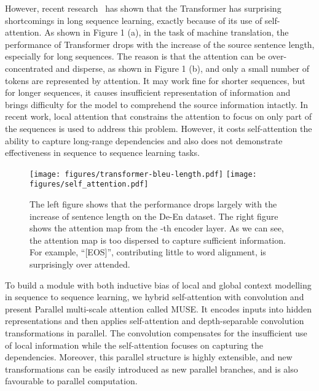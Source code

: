 \documentclass{article} \usepackage{iclr2020_conference,times}
\begin{document}
However, recent research~\citep{DBLP:conf/emnlp/TangMRS18} has shown that the Transformer has surprising shortcomings in long sequence learning, exactly because of its use of self-attention. As shown in Figure 1 (a), in the task of machine translation, the performance of Transformer drops with the increase of the source sentence length, especially for long sequences. The reason is that the attention can be over-concentrated and disperse, as shown in Figure 1 (b), and only a small number of tokens are represented by attention. It may work fine for shorter sequences, but for longer sequences, it  causes insufficient representation of information and brings difficulty for the model to comprehend the source information intactly. In recent work, local attention that constrains the attention to focus on only part of the sequences \citep{child2019generating,Sukhbaatar_2019} is used to address this problem. However, it costs self-attention the ability to capture long-range dependencies and also does not demonstrate effectiveness in sequence to sequence learning tasks.




\begin{figure}[ht]
\centering
\texttt{[image: figures/transformer-bleu-length.pdf]} \qquad
\texttt{[image: figures/self\_attention.pdf]}
\caption{The left figure shows that the performance drops largely with the increase of sentence length on the De-En dataset. The right figure shows the attention map from the -th encoder layer. As we can see, the attention map is too dispersed to capture sufficient information. For example, ``[EOS]'', contributing little to word alignment, is surprisingly over attended.}
\label{fig:motivation}
\end{figure}

To build a module with both inductive bias of local and global context modelling in sequence to sequence learning, we hybrid self-attention with convolution and present Parallel multi-scale attention called MUSE.  It  encodes inputs into hidden representations and then  applies self-attention  and  depth-separable convolution transformations in parallel. The convolution compensates for the insufficient use of local information while the self-attention focuses on capturing the dependencies. Moreover, this parallel structure is highly extensible, and new transformations can be easily introduced as new parallel branches, and is also favourable to parallel computation.
\end{document}
